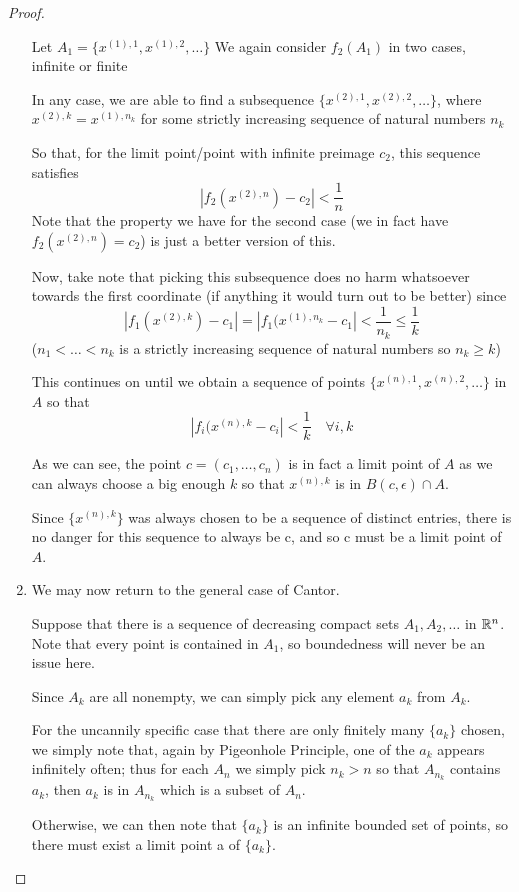 \begin{proof}
\begin{enumerate}[label=(\alph*)]
Let $A_1=\{x^{(1),1},x^{(1),2},\dots\}$
We again consider $f_2(A_1)$ in two cases, infinite or finite

In any case, we are able to find a subsequence $\{x^{(2),1},x^{(2),2},\dots\}$, where
$x^{(2),k}=x^{(1),n_k}$ for some strictly increasing sequence of natural numbers $n_k$

So that, for the limit point/point with infinite preimage $c_2$, this sequence satisfies
\[ |f_2(x^{(2),n})-c_2| < \frac{1}{n} \]
Note that the property we have for the second case (we in fact have $f_2(x^{(2),n})=c_2$) is just a better version of this.

Now, take note that picking this subsequence does no harm whatsoever towards the first coordinate (if anything it would turn out to be better) since
\[ |f_1(x^{(2),k})-c_1| = |f_1(x^{(1),n_k}-c_1| < \frac{1}{n_k} \le \frac{1}{k} \]
($n_1<\dots<n_k$ is a strictly increasing sequence of natural numbers so $n_k \ge k$)

This continues on until we obtain a sequence of points $\{x^{(n),1},x^{(n),2},\dots\}$ in $A$ so that
\[ |f_i(x^{(n),k}-c_i|<\frac{1}{k} \quad \forall i,k \]

As we can see, the point $c=(c_1,\dots,c_n)$ is in fact a limit point of $A$ as we can always choose a big enough $k$ so that $x^{(n),k}$ is in $B(c,\epsilon) \cap A$.

Since $\{x^{(n),k}\}$ was always chosen to be a sequence of distinct entries, there is no danger for this sequence to always be c, and so c must be a limit point of $A$.

\item We may now return to the general case of Cantor.

Suppose that there is a sequence of decreasing compact sets $A_1,A_2,\dots$ in $\mathbb R^n$. 
Note that every point is contained in $A_1$, so boundedness will never be an issue here.

Since $A_k$ are all nonempty, we can simply pick any element $a_k$ from $A_k$.

For the uncannily specific case that there are only finitely many $\{a_k\}$ chosen, we simply note that, again by Pigeonhole Principle, one of the $a_k$ appears infinitely often; thus for each $A_n$ we simply pick $n_k>n$ so that $A_{n_k}$ contains $a_k$, then $a_k$ is in $A_{n_k}$ which is a subset of $A_n$.

Otherwise, we can then note that $\{a_k\}$ is an infinite bounded set of points, so there must exist a limit point a of $\{a_k\}$.


\end{enumerate}
\end{proof}
